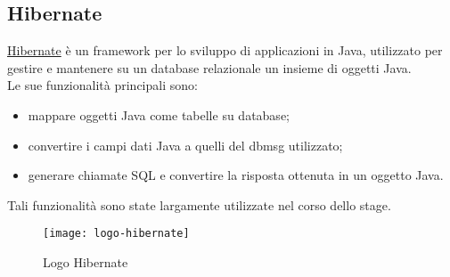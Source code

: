 \subsection{Hibernate}
\href{https://hibernate.org/}{Hibernate} è un framework per lo sviluppo di applicazioni in Java, utilizzato per gestire e mantenere su un database relazionale un insieme di oggetti Java.
\\Le sue funzionalità principali sono:
\begin{itemize}
    \item mappare oggetti Java come tabelle su database;
    \item convertire i campi dati Java a quelli del \gls{dbmsg}\glsfirstoccur{}{} utilizzato;
    \item generare chiamate SQL e convertire la risposta ottenuta in un oggetto Java.
\end{itemize}
Tali funzionalità sono state largamente utilizzate nel corso dello stage.
\begin{figure}[h]
    \begin{center}
    \texttt{[image: logo-hibernate]}
    \caption{Logo Hibernate}
    \label{fig:figure5}
    \end{center}
\end{figure}

